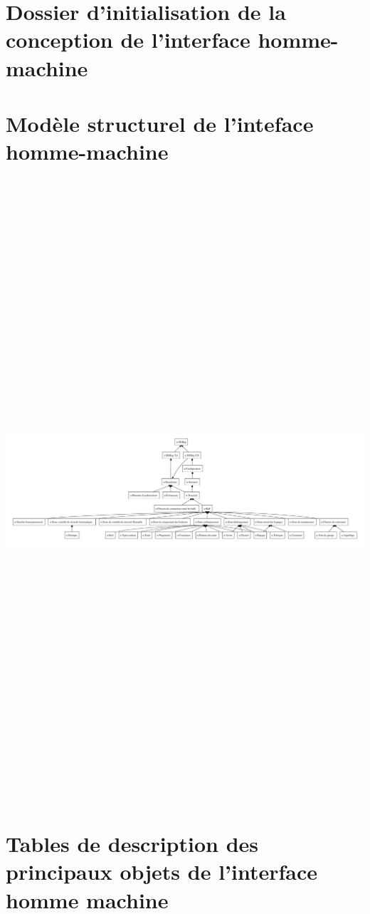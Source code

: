 \part{Dossier d'initialisation de la conception de l'interface homme-machine}

\part{Modèle structurel de l'inteface homme-machine}
\begin{center}
\includegraphics[angle=90, height=23cm]{../../MSIHM/src/img/MSIHM.pdf}
\end{center}
\part{Tables de description des principaux objets de l'interface homme machine}

